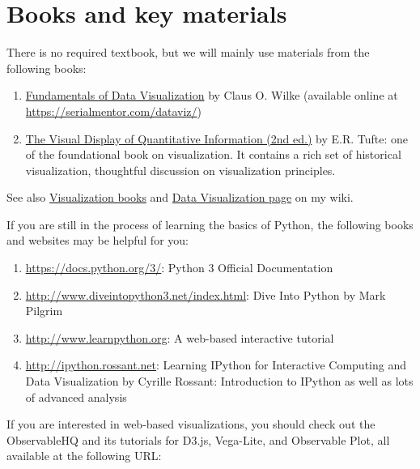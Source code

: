 \documentclass[11pt,article,oneside]{memoir} %
\begin{document}
\section{Books and key materials}%

There is no required textbook, but we will mainly use materials from the following books:

\begin{enumerate}
    
\item \href{https://serialmentor.com/dataviz/}{Fundamentals of Data Visualization} by Claus O. Wilke (available online at \url{https://serialmentor.com/dataviz/})

\item \href{http://www.amazon.com/gp/product/0961392142}{The Visual Display of Quantitative Information (2nd ed.)} by E.R. Tufte: one of the foundational book on visualization. It contains a rich set of historical visualization, thoughtful discussion on visualization principles. 

\end{enumerate}

See also \href{https://yyiki.org/wiki/Data%20visualization/Books/}{Visualization books} and \href{https://yyiki.org/wiki/Data%20visualization/}{Data Visualization page} on my wiki. 


If you are still in the process of learning the basics of Python, the following books and websites may be helpful for you:

\begin{enumerate}%

\item \url{https://docs.python.org/3/}: Python 3 Official Documentation

\item \url{http://www.diveintopython3.net/index.html}: Dive Into Python by Mark Pilgrim 

\item \url{http://www.learnpython.org}: A web-based interactive tutorial 

\item \url{http://ipython.rossant.net}: Learning IPython for Interactive Computing and Data Visualization by Cyrille Rossant: Introduction to IPython as well as lots of advanced analysis 

\end{enumerate}%

If you are interested in web-based visualizations, you should check out the ObservableHQ and its tutorials for D3.js, Vega-Lite, and Observable Plot, all available at the following URL:
\end{document}
